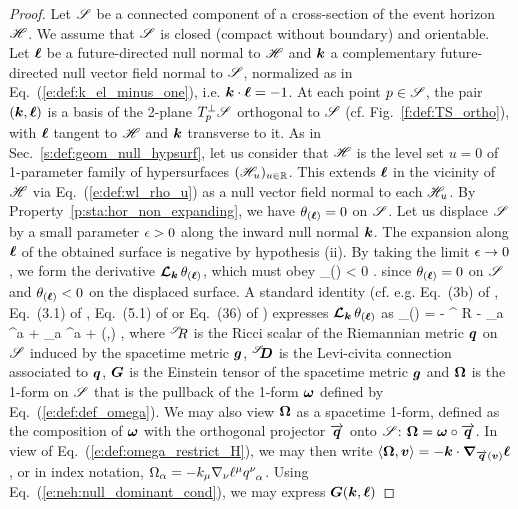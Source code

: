 \begin{proof}
Let $\mathscr{S}$ be a connected component of a cross-section of the event horizon $\mathscr{H}$.
We assume that $\mathscr{S}$ is closed (compact without boundary) and orientable.
Let $\bm{\ell}$ be a future-directed null normal to $\mathscr{H}$ and $\bm{k}$ a complementary
future-directed null vector field
normal to $\mathscr{S}$, normalized as in Eq.~(\ref{e:def:k_el_minus_one}), i.e.
$\bm{k}\cdot\bm{\ell} = -1$. At each point $p\in \mathscr{S}$, the pair $(\bm{k},\bm{\ell})$ is
a basis of the 2-plane $T_p^\perp\mathscr{S}$ orthogonal to $\mathscr{S}$ (cf. Fig.~\ref{f:def:TS_ortho}),
with $\bm{\ell}$ tangent to $\mathscr{H}$ and $\bm{k}$ transverse to it.
As in Sec.~\ref{s:def:geom_null_hypsurf}, let us consider that $\mathscr{H}$
is the level set $u=0$ of 1-parameter family of hypersurfaces $(\mathscr{H}_u)_{u\in\mathbb{R}}$.
This extends $\bm{\ell}$ in the vicinity of $\mathscr{H}$ via Eq.~(\ref{e:def:wl_rho_u})
as a null vector field normal to each $\mathscr{H}_u$.
By Property~\ref{p:sta:hor_non_expanding}, we have $\theta_{(\bm{\ell})} = 0$
on $\mathscr{S}$. Let us displace $\mathscr{S}$ by a small parameter $\epsilon>0$ along the inward
null normal $\bm{k}$. The expansion along $\bm{\ell}$ of the obtained surface is
negative by hypothesis (ii). By taking the limit $\epsilon\to 0$, we form the
derivative $\bm{\mathcal{L}}_{\bm{k}}\, \theta_{(\bm{\ell})}$, which must obey
\be \label{e:sta:Lie_k_l}
     \theta_{(\wl)} < 0 .
\ee
since $\theta_{(\bm{\ell})} = 0$ on $\mathscr{S}$ and
$\theta_{(\bm{\ell})} < 0$ on the displaced surface.
A standard identity (cf. e.g. Eq.~(3b) of \cite{Haywa94}, Eq.~(3.1) of \cite{BoothF07},
Eq.~(5.1) of \cite{Cao11} or Eq.~(36) of \cite{Jaram13})
expresses $\bm{\mathcal{L}}_{\bm{k}}\,\theta_{(\bm{\ell})}$ as
\be \label{e:sta:Lie_k_theta_l}
     \theta_{(\wl)} = -  {}^\Sp\!\! R - \DSc_a \Omega^a
    +  \Omega_a \Omega^a + (,\wl) ,
\ee
where ${}^{\mathscr{S}}\!\! R$ is the Ricci scalar of the Riemannian metric $\bm{q}$ on
$\mathscr{S}$ induced by the spacetime metric $\bm{g}$, ${}^{\mathscr{S}}\!\!\bm{D}$ is the Levi-civita
connection associated to $\bm{q}$,
$\bm{G}$ is the Einstein tensor
of the spacetime metric $\bm{g}$ and $\bm{\Omega}$ is the 1-form on $\mathscr{S}$
that is the pullback of the 1-form $\bm{\omega}$ defined by Eq.~(\ref{e:def:def_omega}).
We may also view $\bm{\Omega}$ as a spacetime 1-form, defined as
the composition of $\bm{\omega}$ with the orthogonal projector $\overrightarrow{\bm{q}}$ onto
$\mathscr{S}$: $\bm{\Omega} = \bm{\omega} \circ \overrightarrow{\bm{q}}$.
In view of Eq.~(\ref{e:def:omega_restrict_H}), we may then write
$\langle\bm{\Omega}, \bm{v} \rangle = - \bm{k} \cdot\bm{\nabla}_{\overrightarrow{\bm{q}}(\bm{v})} \bm{\ell}$,
or in index notation, $\Omega_\alpha  = - k_\mu \nabla_\nu \ell^\mu q^\nu_{\ \, \alpha}$.
Using Eq.~(\ref{e:neh:null_dominant_cond}), we may express $\bm{G}(\bm{k},\bm{\ell})$

\end{proof}
